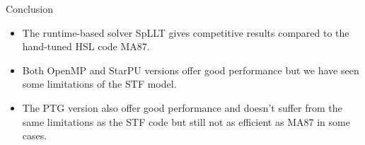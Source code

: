 \documentclass{beamer}
\newcommand{\db}[1]{\textcolor{mblue}{#1\xspace}}
\begin{document}
\begin{frame}{Conclusion}
  \begin{itemize}
  \item The \alert{runtime-based} solver \db{SpLLT} gives competitive
    results compared to the \db{hand-tuned HSL code MA87}.

    \vspace{0.4cm}

  \item Both \alert{OpenMP} and \alert{StarPU} versions offer good
    performance but we have seen some limitations of the \db{STF
      model}.

    \vspace{0.4cm}

  \item The \alert{PTG} version also offer good performance and
    doesn't suffer from the same limitations as the \alert{STF} code
    but still not as efficient as MA87 in some cases.
  \end{itemize}
\end{frame}
\end{document}
